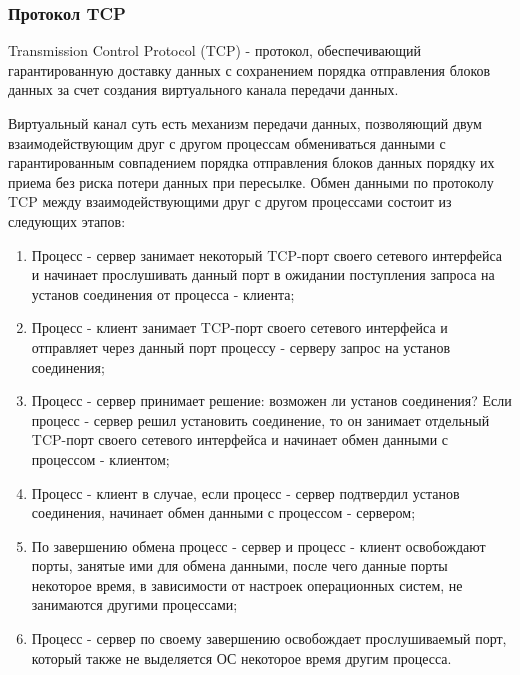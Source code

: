 \subsubsection{Протокол TCP}

	Transmission Control Protocol (TCP) - протокол, обеспечивающий гарантированную доставку данных с сохранением порядка отправления блоков данных
	за счет создания виртуального канала передачи данных.

	Виртуальный канал суть есть механизм передачи данных, позволяющий двум взаимодействующим друг с другом процессам обмениваться данными
	с гарантированным совпадением порядка отправления блоков данных порядку их приема без риска потери данных при пересылке.
	Обмен данными по протоколу TCP между взаимодействующими друг с другом процессами состоит из следующих этапов:

	\begin{enumerate}

		\item Процесс - сервер занимает некоторый TCP-порт своего сетевого интерфейса и начинает прослушивать данный порт в ожидании поступления запроса
		на установ соединения от процесса - клиента;

		\item Процесс - клиент занимает TCP-порт своего сетевого интерфейса и отправляет через данный порт процессу - серверу запрос на установ соединения;

		\item Процесс - сервер принимает решение: возможен ли установ соединения? Если процесс - сервер решил установить соединение,
		то он занимает отдельный TCP-порт своего сетевого интерфейса и начинает обмен данными с процессом - клиентом;

		\item Процесс - клиент в случае, если процесс - сервер подтвердил установ соединения, начинает обмен данными с процессом - сервером;

		\item По завершению обмена процесс - сервер и процесс - клиент освобождают порты, занятые ими для обмена данными, после чего данные порты некоторое
		время, в зависимости от настроек операционных систем, не занимаются другими процессами;

		\item Процесс - сервер по своему завершению освобождает прослушиваемый порт, который также не выделяется ОС некоторое время другим процесса.

	\end{enumerate}

